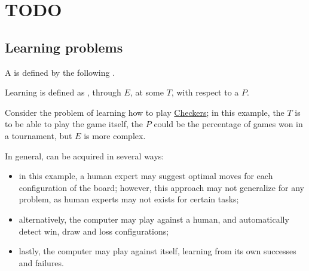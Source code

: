 \documentclass[a4paper, 12pt]{report}
\institute{\curlyquotes{\hspace{0.25mm}Sapienza} Università di Roma}
\subtitle{Appunti integrati con il libro \book}
\author{\textit{Autore}\\\authorName}
\institute{\curlyquotes{\hspace{0.25mm}Sapienza} University of Rome}
\subtitle{Lecture notes integrated with the book \book}
\author{\textit{Author}\\\authorName}
\title{\courseName}
\date{\today}
\begin{document}
    \maketitle

    {
        \hypersetup{allcolors=black}

        \romantableofcontents
    }

    \introduction

    
    \chapter{TODO}
    
    \section{Learning problems}

    A  is defined by the following .

    \begin{frameddefn}{Learning}
         is defined as , through  $E$, at some  $T$, with respect to a  $P$.
    \end{frameddefn}

    \begin{example}
        Consider the problem of learning how to play \href{https://en.wikipedia.org/wiki/Checkers}{Checkers}; in this example, the  $T$ is to be able to play the game itself, the  $P$ could be the percentage of games won in a tournament, but  $E$ is more complex.
    \end{example}

    In general,  can be acquired in several ways:

    \begin{itemize}
        \item in this example, a human expert may suggest optimal moves for each configuration of the board; however, this approach may not generalize for any problem, as human experts may not exists for certain tasks;
        \item alternatively, the computer may play against a human, and automatically detect win, draw and loss configurations;
        \item lastly, the computer may play against itself, learning from its own successes and failures.
    \end{itemize}
\end{document}
